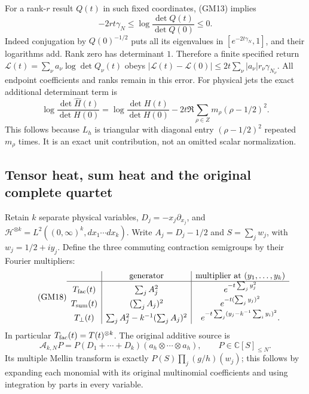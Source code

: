 \documentclass[11pt]{article}
\theoremstyle{remark}\newtheorem{remark}[theorem]{Remark}
\begin{document}
For a rank-$r$ result $Q(t)$ in such fixed coordinates, (GM13) implies
\begin{equation}\tag{GM16}
 -2rt\gamma_N\leq\log\frac{\det Q(t)}{\det Q(0)}\leq0.
\end{equation}
Indeed conjugation by $Q(0)^{-1/2}$ puts all its eigenvalues in
$[e^{-2t\gamma_N},1]$, and their logarithms add.  Rank zero has
determinant $1$.  Therefore a finite specified return
$\mathcal L(t)=\sum_\nu a_\nu\log\det Q_\nu(t)$ obeys
$|\mathcal L(t)-\mathcal L(0)|
\leq2t\sum_\nu|a_\nu|r_\nu\gamma_{N_\nu}$.
All endpoint coefficients and ranks remain in this error.  For
physical jets the exact additional determinant term is
\begin{equation}\tag{GM17}
 \log\frac{\det\widehat H(t)}{\det H(0)}
 =\log\frac{\det H(t)}{\det H(0)}
       -2t\Re\sum_{\rho\in Z}m_\rho(\rho-1/2)^2.
\end{equation}
This follows because $L_h$ is triangular with diagonal entry
$(\rho-1/2)^2$ repeated $m_\rho$ times.  It is an exact unit
contribution, not an omitted scalar normalization.

\subsection{Tensor heat, sum heat and the original complete quartet}

Retain $k$ separate physical variables, $D_j=-x_j\partial_{x_j}$,
and $\mathcal H^{\otimes k}=L^2((0,\infty)^k,dx_1\cdots dx_k)$.
Write $A_j=D_j-1/2$ and $S=\sum_jw_j$, with
$w_j=1/2+iy_j$.  Define the three commuting contraction semigroups
by their Fourier multipliers:
\begin{equation}\tag{GM18}
 \begin{array}{c|c|c}
 &\text{generator}&\text{multiplier at }(y_1,\ldots,y_k)\\ \hline
 T_{\rm fac}(t)&\sum_jA_j^2&e^{-t\sum_jy_j^2}\\
 T_{\rm sum}(t)&(\sum_jA_j)^2&e^{-t(\sum_jy_j)^2}\\
 T_{\perp}(t)&\sum_jA_j^2-k^{-1}(\sum_jA_j)^2
                &e^{-t\sum_j(y_j-k^{-1}\sum_i y_i)^2}.
 \end{array}
\end{equation}
In particular $T_{\rm fac}(t)=T(t)^{\otimes k}$.  The original
additive source is
\[
 \mathcal A_{k,N}P
 =P(D_1+\cdots+D_k)(a_h\otimes\cdots\otimes a_h),
 \qquad P\in\mathbb C[S]_{\leq N}.
\]
Its multiple Mellin transform is exactly
$P(S)\prod_j(g/h)(w_j)$; this follows by expanding each monomial
with its original multinomial coefficients and using integration by
parts in every variable.
\end{document}
